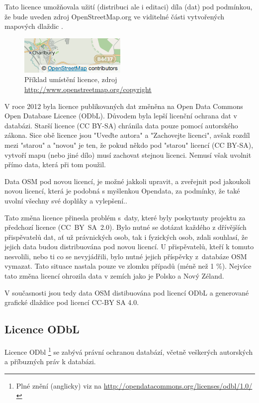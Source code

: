 Tato licence umožňovala užití (distribuci ale i editaci) díla (dat) pod podmínkou,
že bude uveden zdroj OpenStreetMap.org ve viditelné části
vytvořených mapových dlaždic \cite{OSMlicence}.

  \begin{figure}[hbt]
    \centering
      \includegraphics[scale=0.75]{./pictures/attribution_example.png}
      \caption{Příklad umístění licence,
                zdroj \url{http://www.openstreetmap.org/copyright}}
      \label{fig:attribution_example}
  \end{figure} 

V roce 2012 byla licence publikovaných dat změněna na Open Data Commons
Open Database Licence (ODbL).
Důvodem byla lepší licenční ochrana dat v databázi. 
Starší licence (CC BY-SA) chránila data pouze pomocí autorského zákona. 
Sice obě licence jsou "Uveďte autora" a "Zachovejte licenci", avšak rozdíl mezi
"starou" a "novou" je ten, že pokud někdo pod "starou" licencí (CC BY-SA),
vytvoří mapu (nebo jiné dílo) musí zachovat stejnou licenci.
Nemusí však uvolnit přímo data, která při tom použil.

Data OSM pod novou licencí, je možné jakkoli upravit,
a zveřejnit pod jakoukoli novou licencí,
která je podobná s myšlenkou Opendata, 
za podmínky, že také uvolní všechny své doplňky a vylepšení.\cite{OSMlicenceChange}.

Tato změna licence přinesla problém
s~daty, které byly poskytnuty projektu za předchozí licence
(CC~BY~SA~2.0). Bylo nutné se dotázat každého z dřívějších
přispěvatelů dat, ať už právnických osob, tak i fyzických osob,
zdali souhlasí, že jejich data budou distribuována pod novou licencí.
U přispěvatelů, kteří k tomuto nesvolili, nebo ti co se nevyjádřili,
bylo nutné jejich příspěvky z~databáze OSM vymazat.
Tato situace nastala pouze ve zlomku případů (méně než 1 \%).
Nejvíce tato změna licencí ohrozila data v zemích jako je Polsko a Nový Zéland. \cite {OSMlicenceIssue}

V současnosti jsou tedy data OSM distibuována pod licencí ODbL a
generované grafické dlaždice pod licencí CC-BY SA 4.0. \cite{OSMlicence}

\subsection{Licence ODbL}
Licence ODbl \footnote{Plné znění (anglicky) viz na \url{http://opendatacommons.org/licenses/odbl/1.0/}}
se zabývá právní ochranou databází, včetně
veškerých autorských a příbuzných práv k databázi.

